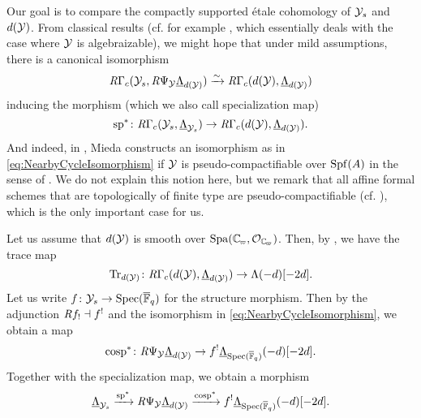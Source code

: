 \documentclass[../main.tex]{subfiles}
\begin{document}
Our goal is to compare the compactly supported \'etale cohomology of $\mathcal{Y}_s$
and $d(\mathcal{Y})$.
From classical results (cf. for example \cite[Corollary 0.7.9]{huber2013etale}, which
essentially deals with the case where $\mathcal{Y}$ is algebraizable),
we might hope that under mild assumptions, there is a canonical isomorphism
\begin{equation}\label{eq:NearbyCycleIsomorphism}
  \mathit R\Gamma_c(\mathcal{Y}_s, \mathit R\Psi_{\mathcal{Y}} \underline \Lambda_{d(\mathcal{Y})}) \xrightarrow{\sim} \mathit R\Gamma_c
  (d(\mathcal{Y}), \underline \Lambda_{d(\mathcal{Y})})
\end{equation}
inducing the morphism (which we also call specialization map)
\begin{equation*}
  \mathrm{sp}^*\colon \mathit R\Gamma_c(\mathcal{Y}_s, \underline \Lambda_{\mathcal{Y}_s}) \to \mathit R
  \Gamma_c(d(\mathcal{Y}), \underline \Lambda_{d(\mathcal{Y})}).
\end{equation*}
And indeed, in \cite[Corollary 4.29]{mieda2014variants}, Mieda constructs an
isomorphism as in \eqref{eq:NearbyCycleIsomorphism}
if $\mathcal{Y}$ is pseudo-compactifiable over $\operatorname{Spf}(A)$ in the sense of \cite[Definition
4.24]{mieda2014variants}. We do not explain this notion here, but we remark that
all affine formal schemes that are topologically of finite type are
pseudo-compactifiable (cf. \cite[Example 4.25]{mieda2014variants}), which is
the only important case for us.

Let us assume that $d(\mathcal{Y})$ is smooth over $\Spa(\Cp, \cO_\Cp)$. Then, by
\cite[Theorem 7.3.4]{huber2013etale}, we have the trace map
\begin{equation*}
  \operatorname{Tr}_{d(\mathcal{Y})} \colon \mathit R  \Gamma_c( d(\mathcal{Y}), \underline \Lambda_{d(\mathcal{Y})} ) \to 
  \Lambda (-d)[-2d].
\end{equation*}
Let us write $f \colon \mathcal{Y}_s \to \operatorname{Spec}({\overline {\mathbb{F}}_q})$ for the structure morphism. Then by the 
adjunction $\mathit R f_! \dashv f^!$ and the isomorphism in \eqref{eq:NearbyCycleIsomorphism},
we obtain a map
\begin{equation*}
  \mathrm{cosp}^* \colon \mathit R\Psi_{\mathcal{Y}} \underline\Lambda_{d(\mathcal{Y})} \to f^!
  \underline\Lambda_{\operatorname{Spec}({\overline {\mathbb{F}}_q})}(-d)[-2d].
\end{equation*}
Together with the specialization map, we obtain a morphism
\begin{equation*}
  \underline \Lambda_{\mathcal{Y}_s} \xrightarrow{\mathrm{sp}^*} \mathit R\Psi_{\mathcal{Y}} \underline\Lambda_{d(\mathcal{Y})} 
  \xrightarrow{\mathrm{cosp}^*} f^! \underline\Lambda_{\operatorname{Spec}({\overline {\mathbb{F}}_q})}(-d)[-2d].
\end{equation*}
\end{document}
